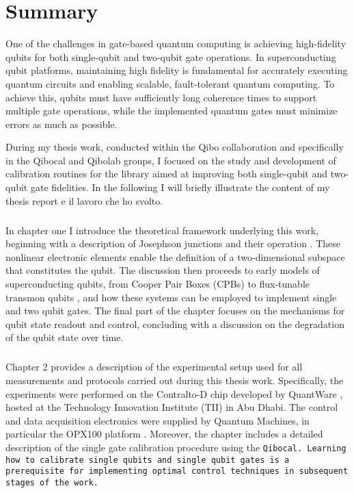 \chapter*{Summary}
One of the challenges in gate-based quantum computing is achieving high-fidelity qubits for both single-qubit and two-qubit gate operations.
In superconducting qubit platforms, maintaining high fidelity is fundamental for accurately executing quantum circuits and enabling scalable, fault-tolerant quantum computing. 
To achieve this, qubits must have sufficiently long coherence times to support multiple gate operations, while the implemented quantum gates must minimize errors as much as possible.

During my thesis work, conducted within the Qibo collaboration and specifically in the Qibocal and Qibolab groups, I focused on the study and development of calibration routines for the \Qibocal library aimed at improving both single-qubit and two-qubit gate fidelities.
In the following I will briefly illustrate the content of my thesis report e il lavoro che ho svolto.

\paragraph{}
In chapter one I introduce the theoretical framework underlying this work, beginning with a description of Josephson junctions and their operation \cite{JOSEPHSON1962251}. 
These nonlinear electronic elements enable the definition of a two-dimensional subspace that constitutes the qubit. 
The discussion then proceeds to early models of superconducting qubits, from Cooper Pair Boxes (CPBs) \cite{Vion2002} to flux-tunable transmon qubits \cite{TransmonPaper}, and how these systems can be employed to implement single and two qubit gates. 
The final part of the chapter focuses on the mechanisms for qubit state readout and control, concluding with a discussion on the degradation of the qubit state over time.

\paragraph{}
Chapter 2 provides a description of the experimental setup used for all measurements and protocols carried out during this thesis work. 
Specifically, the experiments were performed on the Contralto-D chip developed by QuantWare \cite{qw11q}, hosted at the Technology Innovation Institute (TII) in Abu Dhabi. 
The control and data acquisition electronics were supplied by Quantum Machines, in particular the OPX100 platform \cite{opx1000}.
Moreover, the chapter includes a detailed description of the single gate calibration procedure using the \tt{Qibocal}. 
Learning how to calibrate single qubits and single qubit gates is a prerequisite for implementing optimal control techniques in subsequent stages of the work.


